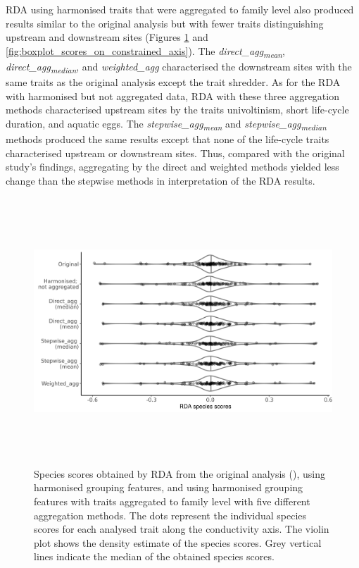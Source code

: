 \documentclass{article}
\begin{document}
RDA using harmonised traits that were aggregated to family level also produced results similar to the original analysis but with fewer traits distinguishing upstream and downstream sites (Figures \ref{fig:violin_plot_species_sc} and \ref{fig:boxplot_scores_on_constrained_axis}). The \textit{direct\_agg\textsubscript{mean}}, \textit{direct\_agg\textsubscript{median}}, and \textit{weighted\_agg} characterised the downstream sites with the same traits as the original analysis except the trait shredder. As for the RDA with harmonised but not aggregated data, RDA with these three aggregation methods characterised upstream sites by the traits univoltinism, short life-cycle duration, and aquatic eggs. The \textit{stepwise\_agg\textsubscript{mean}} and \textit{stepwise\_agg\textsubscript{median}} methods produced the same results except that none of the life-cycle traits characterised upstream or downstream sites. Thus, compared with the original study’s findings, aggregating by the direct and weighted methods yielded less change than the stepwise methods in interpretation of the RDA results.

\begin{figure}[H]
    \centering
    \includegraphics[width=16.5cm, height=10cm]{Species_scores_rda.png}
    \caption{Species scores obtained by RDA from the original analysis (\cite{szocs_effects_2014}), using harmonised grouping features, and using harmonised grouping features with traits aggregated to family level with five different aggregation methods. The dots represent the individual species scores for each analysed trait along the conductivity axis. The violin plot shows the density estimate of the species scores. Grey vertical lines indicate the median of the obtained species scores.}
    \label{fig:violin_plot_species_sc}
\end{figure}
\end{document}
